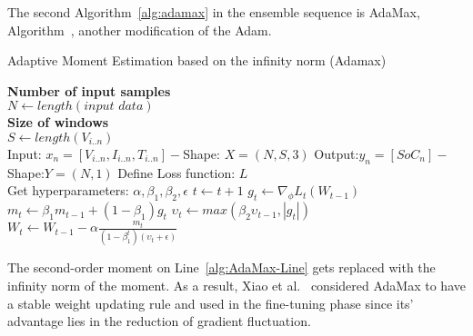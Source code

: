 %
The second \mbox{Algorithm~\ref{alg:adamax}} in the ensemble sequence is AdaMax, \mbox{Algorithm~\cite{kingma_adam_2017}}, another modification of the Adam.
\begin{algorithm}
    \caption{Adaptive Moment Estimation based on the infinity norm (Adamax)}
    \begin{algorithmic}[1]
      \STATE \textbf{Number of input samples} \\ $N\gets length(\textit{input data})$\\
      \STATE \textbf{Size of windows} \\ $S\gets length(V_{i..n})$\\
      \STATE Input: $x_n = [V_{i..n}, I_{i..n}, T_{i..n}] - $Shape: $X = (N, S, 3)$
      \STATE Output:$y_n = [SoC_{n}] - $Shape:$Y = (N, 1)$
      \STATE Define Loss function: $L$ \\
             Get hyperparameters: $\alpha, \beta_1, \beta_2, \epsilon$
      \STATE $t \gets t+1$
      \STATE $g_t \gets \nabla_\phi L_t (W_{t-1})$ 
      \STATE $m_t \gets \beta_1 m_{t-1}+(1-\beta_1) g_t $ 
      \STATE $\upsilon_t \gets max\left(\beta_2\upsilon_{t-1}, |g_t|\right) $ 
      \STATE $W_t \gets W_{t-1}- \alpha \frac{m_t}{(1-\beta^t_1)(\upsilon_t+\epsilon)} $ 
      \ENDWHILE
    \end{algorithmic}
    \label{alg:adamax}
\end{algorithm}
The second-order moment on Line~\ref{alg:AdaMax-Line} gets replaced with the infinity norm of the moment.
As a result, Xiao et al.~\cite{xiao_accurate_2019} considered AdaMax to have a stable weight updating rule and used in the fine-tuning phase since its' advantage lies in the reduction of gradient fluctuation. 

